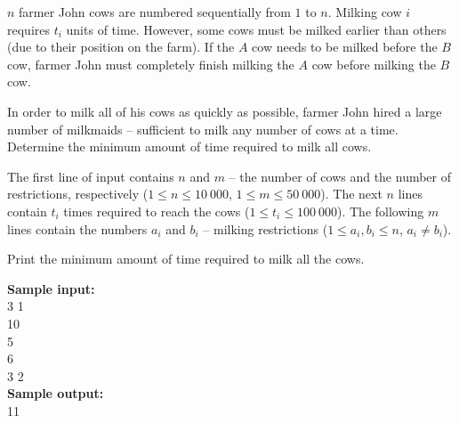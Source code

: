 \documentclass[a4paper]{article}
\begin{document}
$n$ farmer John cows are numbered sequentially from $1$ to $n$. Milking cow $i$ requires $t_i$ units of time. However, some cows must be milked earlier than others (due to their position on the farm). If the $A$ cow needs to be milked before the $B$ cow, farmer John must completely finish milking the $A$ cow before milking the $B$ cow.

In order to milk all of his cows as quickly as possible, farmer John hired a large number of milkmaids -- sufficient to milk any number of cows at a time. Determine the minimum amount of time required to milk all cows.

The first line of input contains $n$ and $m$ -- the number of cows and the number of restrictions, respectively ($1 \le n \le 10 \ 000$, $1 \le m \le 50 \ 000$). The next $n$ lines contain $t_i$ times required to reach the cows ($1 \le t_i \le 100 \ 000$). The following $m$ lines contain the numbers $a_i$ and $b_i$ -- milking restrictions ($1 \le a_i, b_i \le n$, $a_i \ne b_i$).

Print the minimum amount of time required to milk all the cows.

\SPACE

\noindent \textbf{Sample input:}\\
3 1\\
10\\
5\\
6\\
3 2\\


\noindent \textbf{Sample output:}\\
11\\
\end{document}
